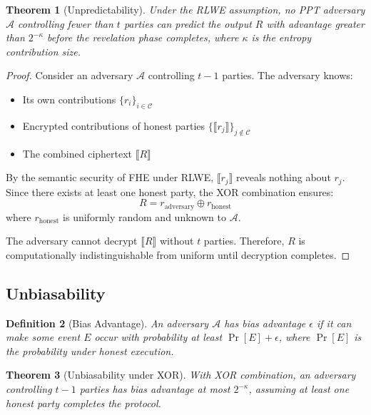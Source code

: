 \documentclass[11pt,a4paper]{article}
\newtheorem{theorem}{Theorem}[section]
\newtheorem{definition}[theorem]{Definition}
\begin{document}
\begin{theorem}[Unpredictability]
Under the RLWE assumption, no PPT adversary $\mathcal{A}$ controlling fewer than $t$ parties can predict the output $R$ with advantage greater than $2^{-\kappa}$ before the revelation phase completes, where $\kappa$ is the entropy contribution size.
\end{theorem}

\begin{proof}
Consider an adversary $\mathcal{A}$ controlling $t-1$ parties. The adversary knows:
\begin{itemize}
    \item Its own contributions $\{r_i\}_{i \in \mathcal{C}}$
    \item Encrypted contributions of honest parties $\{\llbracket r_j \rrbracket\}_{j \notin \mathcal{C}}$
    \item The combined ciphertext $\llbracket R \rrbracket$
\end{itemize}

By the semantic security of FHE under RLWE, $\llbracket r_j \rrbracket$ reveals nothing about $r_j$. Since there exists at least one honest party, the XOR combination ensures:
\begin{equation}
R = r_{\text{adversary}} \oplus r_{\text{honest}}
\end{equation}
where $r_{\text{honest}}$ is uniformly random and unknown to $\mathcal{A}$.

The adversary cannot decrypt $\llbracket R \rrbracket$ without $t$ parties. Therefore, $R$ is computationally indistinguishable from uniform until decryption completes.
\end{proof}

\subsection{Unbiasability}

\begin{definition}[Bias Advantage]
An adversary $\mathcal{A}$ has bias advantage $\epsilon$ if it can make some event $E$ occur with probability at least $\Pr[E] + \epsilon$, where $\Pr[E]$ is the probability under honest execution.
\end{definition}

\begin{theorem}[Unbiasability under XOR]
With XOR combination, an adversary controlling $t-1$ parties has bias advantage at most $2^{-\kappa}$, assuming at least one honest party completes the protocol.
\end{theorem}
\end{document}

